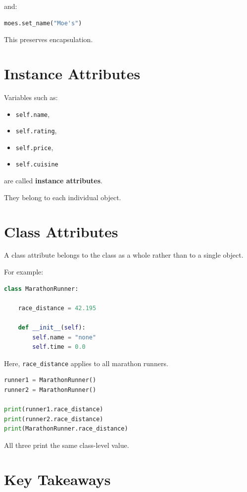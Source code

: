\documentclass[11pt]{article}
\begin{document}
and:

\begin{lstlisting}[language=Python]
moes.set_name("Moe's")
\end{lstlisting}

This preserves encapsulation.

\section{Instance Attributes}

Variables such as:

\begin{itemize}
    \item \verb|self.name|,
    \item \verb|self.rating|,
    \item \verb|self.price|,
    \item \verb|self.cuisine|
\end{itemize}

are called \textbf{instance attributes}.

They belong to each individual object.

\section{Class Attributes}

A class attribute belongs to the class as a whole rather than to a single object.

For example:

\begin{lstlisting}[language=Python]
class MarathonRunner:

    race_distance = 42.195

    def __init__(self):
        self.name = "none"
        self.time = 0.0
\end{lstlisting}

Here, \verb|race_distance| applies to all marathon runners.

\begin{lstlisting}[language=Python]
runner1 = MarathonRunner()
runner2 = MarathonRunner()

print(runner1.race_distance)
print(runner2.race_distance)
print(MarathonRunner.race_distance)
\end{lstlisting}

All three print the same class-level value.

\section{Key Takeaways}
\end{document}
